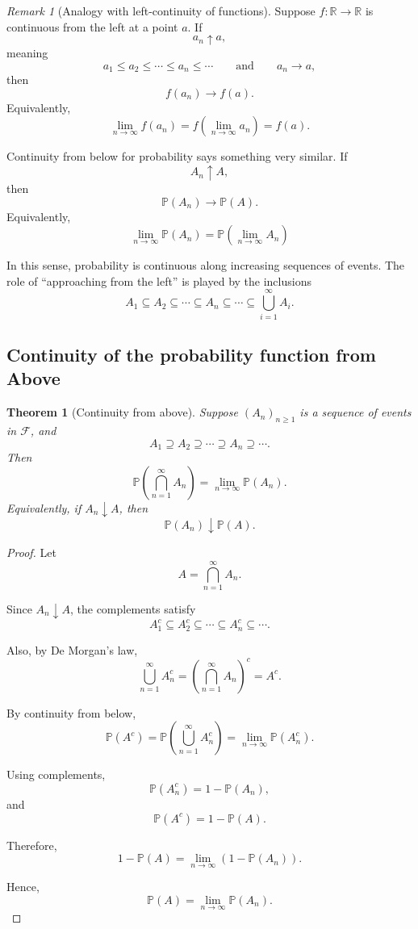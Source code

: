 \documentclass[11pt]{article}
\newcommand{\Prob}{\mathbb{P}}
\theoremstyle{definition}
\theoremstyle{plain}
\newtheorem{theorem}{Theorem}
\theoremstyle{remark}
\newtheorem{remark}{Remark}
\begin{document}
\begin{remark}[Analogy with left-continuity of functions] Suppose $f:\mathbb{R}\to\mathbb{R}$ is continuous from the left at a point $a$. If
\[
a_n\uparrow a,
\]
meaning
\[
a_1\le a_2\le \cdots \le a_n\le \cdots
\qquad \text{and} \qquad
a_n\to a,
\]
then
\[
f(a_n)\to f(a).
\]
Equivalently,
\[
\lim_{n\to\infty} f(a_n)
=
f\left(\lim_{n\to\infty}a_n\right)
=
f(a).
\]

Continuity from below for probability says something very similar. If
\[
A_n\uparrow A,
\]
then
\[
\Prob(A_n)\to \Prob(A).
\]
Equivalently,
\begin{equation*}
    \lim_{n\to \infty}\mathbb{P}(A_n) = \mathbb{P}(\lim_{n\to \infty} A_n)
\end{equation*}

In this sense, probability is continuous along increasing sequences of events. The role of ``approaching from the left'' is played by the inclusions
\[
A_1\subseteq A_2\subseteq \cdots \subseteq A_n\subseteq \cdots \subseteq \bigcup_{i=1}^\infty A_i.
\]
\end{remark}

\subsection*{Continuity of the probability function from Above}

\begin{theorem}[Continuity from above] \label{conabov}
Suppose $(A_n)_{n\geq 1}$ is a sequence of events in $\mathcal{F}$, and
\[
A_1\supseteq A_2\supseteq \cdots \supseteq A_n\supseteq \cdots.
\]
Then
\[
\Prob\left(\bigcap_{n=1}^{\infty} A_n\right)
=
\lim_{n\to\infty} \Prob(A_n).
\]
Equivalently, if $A_n\downarrow A$, then
\[
\Prob(A_n)\downarrow \Prob(A).
\]
\end{theorem}

\begin{proof}
Let
\[
A=\bigcap_{n=1}^{\infty} A_n.
\]

Since $A_n\downarrow A$, the complements satisfy
\[
A_1^c\subseteq A_2^c\subseteq \cdots \subseteq A_n^c\subseteq \cdots.
\]

Also, by De Morgan's law,
\[
\bigcup_{n=1}^{\infty} A_n^c
=
\left(\bigcap_{n=1}^{\infty} A_n\right)^c
=
A^c.
\]

By continuity from below,
\[
\Prob(A^c)
=
\Prob\left(\bigcup_{n=1}^{\infty} A_n^c\right)
=
\lim_{n\to\infty}\Prob(A_n^c).
\]

Using complements,
\[
\Prob(A_n^c)=1-\Prob(A_n),
\]
and
\[
\Prob(A^c)=1-\Prob(A).
\]

Therefore,
\[
1-\Prob(A)
=
\lim_{n\to\infty}\left(1-\Prob(A_n)\right).
\]

Hence,
\[
\Prob(A)
=
\lim_{n\to\infty}\Prob(A_n).
\]
\end{proof}
\end{document}

